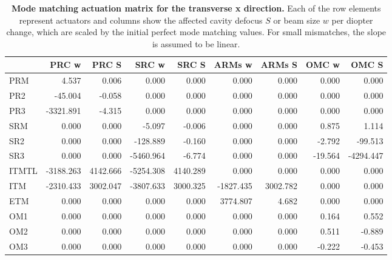 	\begin{table}
	\centering
	\begin{tabular}{|l||r|r|r|r|r|r|r|r|}
		\hline
		{} &     PRC w &    PRC S &     SRC w &    SRC S &    ARMs w &   ARMs S &   OMC w &     OMC S \\
		\hline
		\hline
		PRM   &     4.537 &    0.006 &     0.000 &    0.000 &     0.000 &    0.000 &   0.000 &     0.000 \\
		PR2   &   -45.004 &   -0.058 &     0.000 &    0.000 &     0.000 &    0.000 &   0.000 &     0.000 \\
		PR3   & -3321.891 &   -4.315 &     0.000 &    0.000 &     0.000 &    0.000 &   0.000 &     0.000 \\
		SRM   &     0.000 &    0.000 &    -5.097 &   -0.006 &     0.000 &    0.000 &   0.875 &     1.114 \\
		SR2   &     0.000 &    0.000 &  -128.889 &   -0.160 &     0.000 &    0.000 &  -2.792 &   -99.513 \\
		SR3   &     0.000 &    0.000 & -5460.964 &   -6.774 &     0.000 &    0.000 & -19.564 & -4294.447 \\
		ITMTL & -3188.263 & 4142.666 & -5254.308 & 4140.289 &     0.000 & 	 0.000 &   0.000 &     0.000 \\
		ITM   & -2310.433 & 3002.047 & -3807.633 & 3000.325 & -1827.435 & 3002.782 &   0.000 &     0.000 \\
		ETM   &     0.000 &    0.000 &     0.000 &    0.000 &  3774.807 &    4.682 &   0.000 &     0.000 \\
		OM1   &     0.000 &    0.000 &     0.000 &    0.000 &     0.000 &    0.000 &   0.164 &     0.552 \\
		OM2   &     0.000 &    0.000 &     0.000 &    0.000 &     0.000 &    0.000 &   0.511 &    -0.889 \\
		OM3   &     0.000 &    0.000 &     0.000 &    0.000 &     0.000 &    0.000 &  -0.222 &    -0.453 \\
		\hline
	\end{tabular}
	\caption[Mode matching actuation matrix for the transverse x direction.]
	{\textbf{Mode matching actuation matrix for the transverse x direction.} Each of the row elements represent actuators and columns show the affected cavity defocus $S$ or beam size $w$ per diopter change, which are scaled by the initial perfect mode matching values.  For small mismatches, the slope is assumed to be linear.}
	\label{tbl:x_act_matrix}
\end{table}

